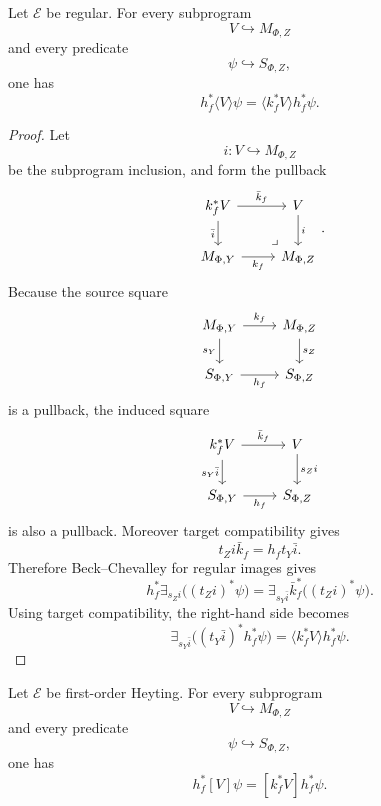 \begin{proposition}
\label{prop:relative-diamond-stability-downstream}
Let \(\mathcal E\) be regular. For every subprogram
\[
V\hookrightarrow M_{\Phi,Z}
\]
and every predicate
\[
\psi\hookrightarrow S_{\Phi,Z},
\]
one has
\[
h_f^\ast\langle V\rangle\psi
=
\langle k_f^\ast V\rangle h_f^\ast\psi.
\]
\end{proposition}

\begin{proof}
Let
\[
i:V\hookrightarrow M_{\Phi,Z}
\]
be the subprogram inclusion, and form the pullback
\[
\begin{tikzcd}
k_f^\ast V \arrow[r,"\bar k_f"] \arrow[d,"\bar i"']
&
V \arrow[d,"i"]
\\
M_{\Phi,Y} \arrow[r,"k_f"']
&
M_{\Phi,Z}
\arrow[ul,phantom,very near start,"\lrcorner"]
\end{tikzcd}
.
\]
Because the source square
\[
\begin{tikzcd}
M_{\Phi,Y} \arrow[r,"k_f"] \arrow[d,"s_Y"']
&
M_{\Phi,Z} \arrow[d,"s_Z"]
\\
S_{\Phi,Y} \arrow[r,"h_f"']
&
S_{\Phi,Z}
\end{tikzcd}
\]
is a pullback, the induced square
\[
\begin{tikzcd}
k_f^\ast V \arrow[r,"\bar k_f"] \arrow[d,"s_Y\bar i"']
&
V \arrow[d,"s_Z i"]
\\
S_{\Phi,Y} \arrow[r,"h_f"']
&
S_{\Phi,Z}
\end{tikzcd}
\]
is also a pullback. Moreover target compatibility gives
\[
t_Z i\bar k_f=h_f t_Y\bar i.
\]
Therefore Beck--Chevalley for regular images gives
\[
h_f^\ast\exists_{s_Z i}\bigl((t_Z i)^\ast\psi\bigr)
=
\exists_{s_Y\bar i}\bar k_f^\ast\bigl((t_Z i)^\ast\psi\bigr).
\]
Using target compatibility, the right-hand side becomes
\[
\exists_{s_Y\bar i}\bigl((t_Y\bar i)^\ast h_f^\ast\psi\bigr)
=
\langle k_f^\ast V\rangle h_f^\ast\psi.
\]
\end{proof}

\begin{proposition}
\label{prop:relative-box-stability-downstream}
Let \(\mathcal E\) be first-order Heyting. For every subprogram
\[
V\hookrightarrow M_{\Phi,Z}
\]
and every predicate
\[
\psi\hookrightarrow S_{\Phi,Z},
\]
one has
\[
h_f^\ast[V]\psi
=
[k_f^\ast V]h_f^\ast\psi.
\]
\end{proposition}

